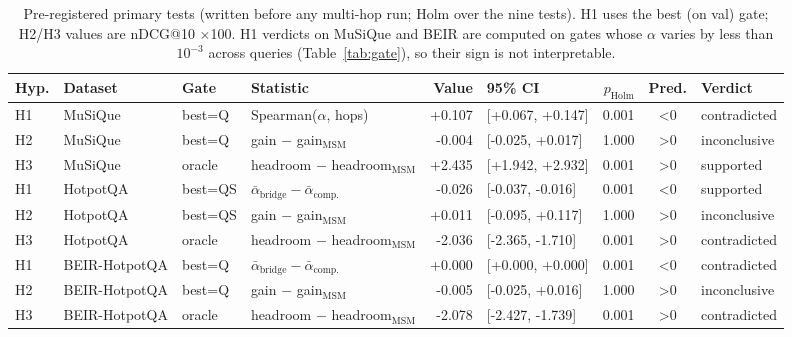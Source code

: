 \begin{table}[t]
\centering\small\setlength{\tabcolsep}{3.5pt}
\begin{tabular}{llllrlrcl}
\toprule
Hyp. & Dataset & Gate & Statistic & Value & 95\% CI & $p_{\text{Holm}}$ & Pred. & Verdict \\
\midrule
H1 & MuSiQue & best=Q & Spearman($\alpha$, hops) & +0.107 & [+0.067, +0.147] & 0.001 & <0 & contradicted \\
H2 & MuSiQue & best=Q & gain $-$ gain$_{\text{MSM}}$ & -0.004 & [-0.025, +0.017] & 1.000 & >0 & inconclusive \\
H3 & MuSiQue & oracle & headroom $-$ headroom$_{\text{MSM}}$ & +2.435 & [+1.942, +2.932] & 0.001 & >0 & supported \\
H1 & HotpotQA & best=QS & $\bar\alpha_{\text{bridge}}-\bar\alpha_{\text{comp.}}$ & -0.026 & [-0.037, -0.016] & 0.001 & <0 & supported \\
H2 & HotpotQA & best=QS & gain $-$ gain$_{\text{MSM}}$ & +0.011 & [-0.095, +0.117] & 1.000 & >0 & inconclusive \\
H3 & HotpotQA & oracle & headroom $-$ headroom$_{\text{MSM}}$ & -2.036 & [-2.365, -1.710] & 0.001 & >0 & contradicted \\
H1 & BEIR-HotpotQA & best=Q & $\bar\alpha_{\text{bridge}}-\bar\alpha_{\text{comp.}}$ & +0.000 & [+0.000, +0.000] & 0.001 & <0 & contradicted \\
H2 & BEIR-HotpotQA & best=Q & gain $-$ gain$_{\text{MSM}}$ & -0.005 & [-0.025, +0.016] & 1.000 & >0 & inconclusive \\
H3 & BEIR-HotpotQA & oracle & headroom $-$ headroom$_{\text{MSM}}$ & -2.078 & [-2.427, -1.739] & 0.001 & >0 & contradicted \\
\bottomrule
\end{tabular}
\caption{Pre-registered primary tests (written before any multi-hop run; Holm over the nine tests). H1 uses the best (on val) gate; H2/H3 values are nDCG@10 $\times$100. H1 verdicts on MuSiQue and BEIR are computed on gates whose $\alpha$ varies by less than $10^{-3}$ across queries (Table~\ref{tab:gate}), so their sign is not interpretable.}
\label{tab:hyp}
\end{table}
